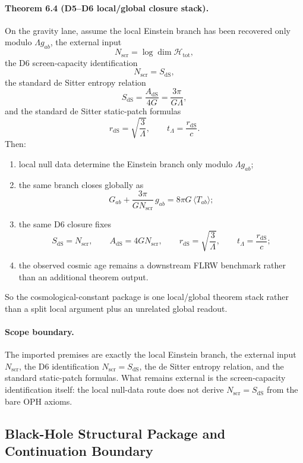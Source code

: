 \paragraph{\textbf{Theorem 6.4 (D5--D6 local/global closure stack).}}
On the gravity lane, assume the local Einstein branch has been recovered only modulo
\(\Lambda g_{ab}\), the external input
\[
N_{\mathrm{scr}}=\log \dim \mathcal H_{\mathrm{tot}},
\]
the D6 screen-capacity identification
\[
N_{\mathrm{scr}}=S_{\mathrm{dS}},
\]
\noindent the standard de Sitter entropy relation
\[
S_{\mathrm{dS}}=\frac{A_{\mathrm{dS}}}{4G}=\frac{3\pi}{G\Lambda},
\]
and the standard de Sitter static-patch formulas
\[
r_{\mathrm{dS}}=\sqrt{\frac{3}{\Lambda}},
\qquad
t_\Lambda=\frac{r_{\mathrm{dS}}}{c}.
\]
Then:
\begin{enumerate}[leftmargin=2em]
\item local null data determine the Einstein branch only modulo \(\Lambda g_{ab}\);
\item the same branch closes globally as
\[
G_{ab}+\frac{3\pi}{G N_{\mathrm{scr}}}\,g_{ab}=8\pi G\,\langle T_{ab}\rangle;
\]
\item the same D6 closure fixes
\[
S_{\mathrm{dS}}=N_{\mathrm{scr}},
\qquad
A_{\mathrm{dS}}=4G N_{\mathrm{scr}},
\qquad
r_{\mathrm{dS}}=\sqrt{\frac{3}{\Lambda}},
\qquad
t_\Lambda=\frac{r_{\mathrm{dS}}}{c};
\]
\item the observed cosmic age remains a downstream FLRW benchmark rather than an additional theorem output.
\end{enumerate}
So the cosmological-constant package is one local/global theorem stack rather than a split local
argument plus an unrelated global readout.

\paragraph{\textbf{Scope boundary.}}
The imported premises are exactly the local Einstein branch, the external input
\(N_{\mathrm{scr}}\), the D6 identification \(N_{\mathrm{scr}}=S_{\mathrm{dS}}\), the de Sitter
entropy relation, and the standard static-patch formulas. What remains external is the
screen-capacity identification itself: the local null-data route does not derive
\(N_{\mathrm{scr}}=S_{\mathrm{dS}}\) from the bare OPH axioms.

\subsection{Black-Hole Structural Package and Continuation Boundary}

